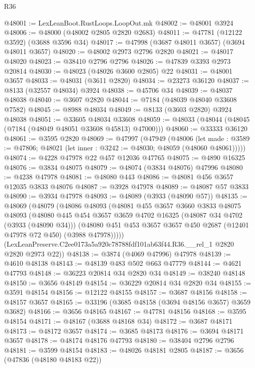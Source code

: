 \begin{lexlean}{R36}
\begin{coremodule}
@48001 := LexLeanBoot.RustLoops.LoopOut.mk
@48002 := @48001 @3924
@48006 := @48000 (@48002 @2805 @2820 @2683)
@48011 := @47781 (@12122 @3592) (@3688 @3596 @34)
@48017 := @47998 (@3687 @48011 @3657) (@3694 @48011 @3657)
@48020 := @48002 @2973 @2796 @2820
@48021 := @48017 @48020
@48023 := @38410 @2796 @2796
@48026 := @47839 @3393 @2973 @20814
@48030 := @48023 (@48026 @3600 @2805) @22
@48031 := @48001 @3657
@48033 := @48031 (@3611 @2820)
@48034 := @23273 @36120
@48037 := @8133 (@32557 @48034) @3924
@48038 := @45706 @34
@48039 := @48037 @48038
@48040 := @3607 @2820
@48044 := @7184 (@48039 @48040 @33608 @7582)
@48045 := @8988 @48034
@48049 := @8133 (@3603 @2820) @3924 @48038
@48051 := @33605 @48034 @33608
@48059 := @48033 (@48044 (@48045 (@7184 (@48049 @48051 @33608 @45813) @47000)))
@48060 := @33333 @36120
@48061 := @3595 @2820
@48069 := @47997
    (@47949
      (@48006
        (let made : @3589 := @47806; @48021 (let inner : @3242 := @48030; @48059 (@48060 @48061)))))
@48074 := @4228 @47978 @22 @457 @12036 @47765
@48075 := @4890 @16325
@48076 := @3834 @48075
@48079 := @48074 (@3834 @48076) @47996
@48080 := @4238 @47978
@48081 := @48080 @443
@48086 := @48081 @456 @3657 @12035 @3833 @48076
@48087 := @3928 @47978
@48089 := @48087 @57 @3833
@48090 := @3934 @47978
@48093 := @48089 (@3933 (@48090 @57))
@48135 := @48069
    (@48079
      (@48086
        @48093
        (@48081
          @455
          @3657
          @3660
          @3833
          @48075
          @48093
          (@48080
            @445
            @454
            @3657
            @3659
            @4702
            @16325
            (@48087 @34 @4702 (@3933 (@48090 @34)))
            (@48080 @451 @453 @3657 @3657 @450 @2687 (@12401 @47978 @72 @450) (@3988 @47978)))))
      (LexLeanPreserve.C2ee0173a5a920c78788fdf101ab63f44.R36.__rel_1 @2820 @2820 @2973 @22))
@48138 := @3874 (@4069 @47996) @47978
@48139 := @4610 @48138
@48143 := @48139 @483 @502 @663 @47779
@48144 := @4621 @47793
@48148 := @36223 @20814 @34 @2820 @34
@48149 := @38240 @48148
@48150 := @3656 @48149
@48154 := @36229 @20814 @34 @2820 @34
@48155 := @3591 @48154
@48156 := @12122 @48155
@48157 := @3687 @48156
@48158 := @48157 @3657
@48165 := @33196 (@3685 @48158 (@3694 @48156 @3657) @3659 @3682)
@48166 := @3656 @48165
@48167 := @47781 @48156
@48168 := @3595 @48154
@48171 := @48167 (@3688 @48168 @34)
@48172 := @3687 @48171
@48173 := @48172 @3657
@48174 := @3685 @48173
@48176 := @3694 @48171 @3657
@48178 := @48174 @48176 @47793
@48180 := @38404 @2796 @2796
@48181 := @3599 @48154
@48183 := @48026 @48181 @2805
@48187 := @3656 (@47836 (@48180 @48183 @22))

\end{coremodule}
\end{lexlean}
